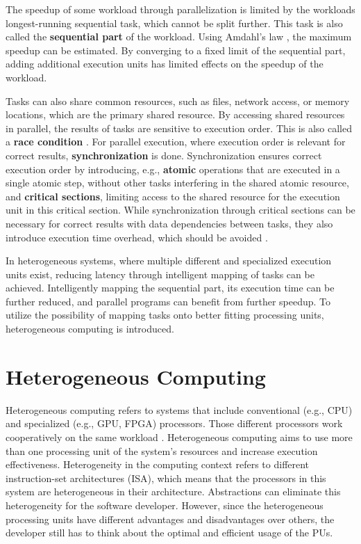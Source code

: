 The speedup of some workload through parallelization is limited by the workloads longest-running sequential task, which cannot be split further. This task is also called the \textbf{sequential part} of the workload. Using Amdahl's law \cite{amdahlValiditySingleProcessor1967}, the maximum speedup can be estimated. By converging to a fixed limit of the sequential part, adding additional execution units has limited effects on the speedup of the workload.

Tasks can also share common resources, such as files, network access, or memory locations, which are the primary shared resource. By accessing shared resources in parallel, the results of tasks are sensitive to execution order. This is also called a \textbf{race condition} \cite{dijkstraCooperatingSequentialProcesses2002}. For parallel execution, where execution order is relevant for correct results, \textbf{synchronization} is done. Synchronization ensures correct execution order by introducing, e.g., \textbf{atomic} operations that are executed in a single atomic step, without other tasks interfering in the shared atomic resource, and \textbf{critical sections}, limiting access to the shared resource for the execution unit in this critical section. While synchronization through critical sections can be necessary for correct results with data dependencies between tasks, they also introduce execution time overhead, which should be avoided \cite{breshearsArtConcurrencyThread2009, shoshaniSequencingTasksMultiprocess1970}.

In heterogeneous systems, where multiple different and specialized execution units exist, reducing latency through intelligent mapping of tasks can be achieved. Intelligently mapping the sequential part, its execution time can be further reduced, and parallel programs can benefit from further speedup. To utilize the possibility of mapping tasks onto better fitting processing units, heterogeneous computing is introduced.

\section{Heterogeneous Computing}
Heterogeneous computing refers to systems that include conventional (e.g., CPU) and specialized (e.g., GPU, FPGA) processors. Those different processors work cooperatively on the same workload \cite{shanHeterogeneousProcessingStrategy2006}. Heterogeneous computing aims to use more than one processing unit of the system's resources and increase execution effectiveness. Heterogeneity in the computing context refers to different instruction-set architectures (ISA), which means that the processors in this system are heterogeneous in their architecture.
Abstractions can eliminate this heterogeneity for the software developer. However, since the heterogeneous processing units have different advantages and disadvantages over others, the developer still has to think about the optimal and efficient usage of the PUs.

